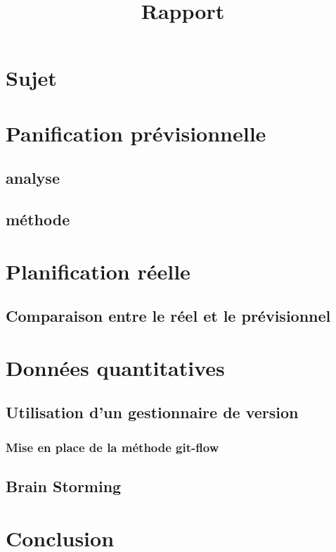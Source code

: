 \documentclass{report}
\title{Rapport}
\author{}
\date{}
\begin{document}
\maketitle

\newpage
\null %
\newpage

\tableofcontents %
\newpage

\chapter{Sujet}
\chapter{Panification prévisionnelle}
\section{analyse}
\section{méthode}

\chapter{Planification réelle}
\section{Comparaison entre le réel et le prévisionnel}

\chapter{Données quantitatives}
\section{Utilisation d'un gestionnaire de version}
\subsection{Mise en place de la méthode git-flow}
\section{Brain Storming}

\chapter{Conclusion}
\end{document}
